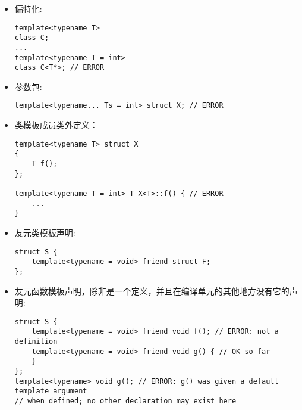 \begin{itemize}
\item 
偏特化:

\begin{lstlisting}[style=styleCXX]
template<typename T>
class C;
...
template<typename T = int>
class C<T*>; // ERROR
\end{lstlisting}

\item 
参数包:

\begin{lstlisting}[style=styleCXX]
template<typename... Ts = int> struct X; // ERROR
\end{lstlisting}

\item 
类模板成员类外定义：

\begin{lstlisting}[style=styleCXX]
template<typename T> struct X
{
	T f();
};

template<typename T = int> T X<T>::f() { // ERROR
	...
}
\end{lstlisting}

\item 
友元类模板声明:

\begin{lstlisting}[style=styleCXX]
struct S {
	template<typename = void> friend struct F;
};
\end{lstlisting}

\item 
友元函数模板声明，除非是一个定义，并且在编译单元的其他地方没有它的声明:

\begin{lstlisting}[style=styleCXX]
struct S {
	template<typename = void> friend void f(); // ERROR: not a definition
	template<typename = void> friend void g() { // OK so far
	}
};
template<typename> void g(); // ERROR: g() was given a default template argument
// when defined; no other declaration may exist here
\end{lstlisting}

\end{itemize}















